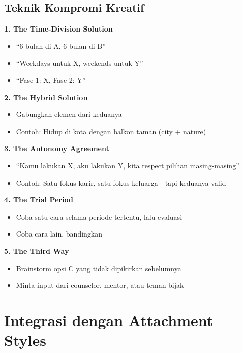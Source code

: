 \subsection{Teknik Kompromi Kreatif}

\begin{tipbox}
\textbf{1. The Time-Division Solution}
\begin{itemize}
    \item ``6 bulan di A, 6 bulan di B''
    \item ``Weekdays untuk X, weekends untuk Y''
    \item ``Fase 1: X, Fase 2: Y''
\end{itemize}

\textbf{2. The Hybrid Solution}
\begin{itemize}
    \item Gabungkan elemen dari keduanya
    \item Contoh: Hidup di kota dengan balkon taman (city + nature)
\end{itemize}

\textbf{3. The Autonomy Agreement}
\begin{itemize}
    \item ``Kamu lakukan X, aku lakukan Y, kita respect pilihan masing-masing''
    \item Contoh: Satu fokus karir, satu fokus keluarga---tapi keduanya valid
\end{itemize}

\textbf{4. The Trial Period}
\begin{itemize}
    \item Coba satu cara selama periode tertentu, lalu evaluasi
    \item Coba cara lain, bandingkan
\end{itemize}

\textbf{5. The Third Way}
\begin{itemize}
    \item Brainstorm opsi C yang tidak dipikirkan sebelumnya
    \item Minta input dari counselor, mentor, atau teman bijak
\end{itemize}
\end{tipbox}

\section{Integrasi dengan Attachment Styles}


